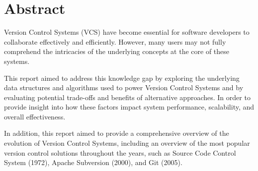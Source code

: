 \chapter*{Abstract}

Version Control Systems (VCS) have become essential for software developers to collaborate effectively and efficiently. However, many users may not fully comprehend the intricacies of the underlying concepts at the core of these systems.
\vspace{9pt}

This report aimed to address this knowledge gap by exploring the underlying data structures and algorithms used to power Version Control Systems and by evaluating potential trade-offs and benefits of alternative approaches. In order to provide insight into how these factors impact system performance, scalability, and overall effectiveness.
\vspace{9pt}

In addition, this report aimed to provide a comprehensive overview of the evolution of Version Control Systems, including an overview of the most popular version control solutions throughout the years, such as Source Code Control System (1972), Apache Subversion (2000), and Git (2005).